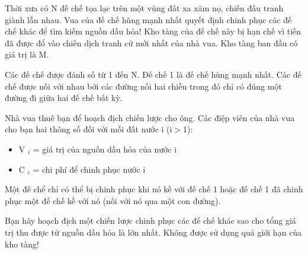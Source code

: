 Thời xưa có N đế chế tọa lạc trên một vùng đất xa xăm nọ, chiến đấu tranh giành lẫn nhau. Vua của đế chế hùng mạnh nhất quyết định chinh phục các đế chế khác để tìm kiếm nguồn dầu hỏa! Kho tàng của đế chế này bị hạn chế vì tiền đã được đổ vào chiến dịch tranh cử mới nhất của nhà vua. Kho tàng ban đầu có giá trị là M.

Các đế chế được đánh số từ 1 đến N. Đế chế 1 là đế chế hùng mạnh nhất. Các đế chế được nối với nhau bởi các đường nối hai chiều trong đó chỉ có đúng một đường đi giữa hai đế chế bất kỳ.

Nhà vua thuê bạn để hoạch địch chiến lược cho ông. Các điệp viên của nhà vua cho bạn hai thông số đối với mỗi đất nước i (i$>$1):
\begin{itemize}
	\item V $_ i $ = giá trị của nguồn dầu hỏa của nước i
	\item C $_ i $ = chi phí để chinh phục nước i
\end{itemize}

Một đế chể chỉ có thể bị chinh phục khi nó kề với đế chế 1 hoặc đế chế 1 đã chinh phục một đế chế kề với nó (nối với nó qua một con đường).

Bạn hãy hoạch địch một chiến lược chinh phục các đế chế khác sao cho tổng giá trị thu được từ nguồn dầu hỏa là lớn nhất. Không được sử dụng quá giới hạn của kho tàng!